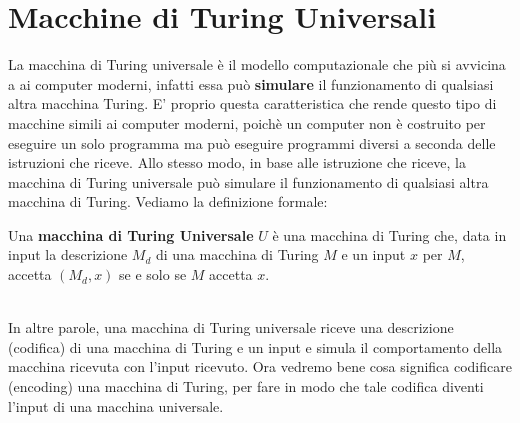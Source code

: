 \section{Macchine di Turing Universali}
La macchina di Turing universale è il modello computazionale che più si avvicina a ai computer moderni, infatti essa può \textbf{simulare} il funzionamento di qualsiasi altra macchina Turing. E' proprio questa caratteristica che 
rende questo tipo di macchine simili ai computer moderni, poichè un computer non è costruito per eseguire un solo programma ma può eseguire programmi diversi a seconda delle istruzioni che riceve. Allo stesso modo, in base alle 
istruzione che riceve, la macchina di Turing universale può simulare il funzionamento di qualsiasi altra macchina di Turing. Vediamo la definizione formale:\smallskip\\
\colorbox{SALZO}{\parbox{\dimexpr\linewidth-2\fboxsep}{\begin{definition}
   Una \textbf{macchina di Turing Universale} $U$ è una macchina di Turing che, data in input la descrizione $M_d$
   di una macchina di Turing $M$ e un input $x$ per $M$, accetta $(M_d,x)$ se e solo se $M$ accetta $x$.
\end{definition}}}\smallskip\\
In altre parole, una macchina di Turing universale riceve una descrizione (codifica) di una macchina di Turing e un input e simula il comportamento della macchina ricevuta con l'input ricevuto. Ora vedremo bene
cosa significa codificare (encoding) una macchina di Turing, per fare in modo che tale codifica diventi l'input di una macchina universale.


